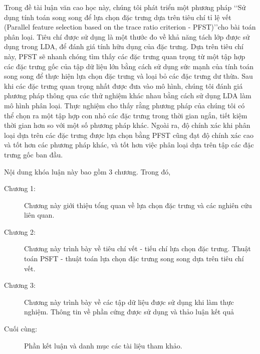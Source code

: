 Trong đề tài luận văn cao học này, chúng tôi phát triển một phương pháp \lq\lq Sử dụng tính toán song song để lựa chọn đặc trưng dựa trên tiêu chí tỉ lệ vết (Parallel feature selection based on the trace ratio criterion - PFST)\rq\rq cho bài toán phân loại. Tiêu chí được sử dụng là một thước đo về khả năng tách lớp được sử dụng trong LDA, để đánh giá tính hữu dụng của đặc trưng. Dựa trên tiêu chí này, PFST sẽ nhanh chóng tìm thấy các đặc trưng quan trọng từ một tập hợp các đặc trưng gốc của tập dữ liệu lớn bằng cách sử dụng sức mạnh của tính toán song song để thực hiện lựa chọn đặc trưng và loại bỏ các đặc trưng dư thừa. Sau khi các đặc trưng quan trọng nhất được đưa vào mô hình, chúng tôi đánh giá phương pháp thông qua các thử nghiệm khác nhau bằng cách sử dụng LDA làm mô hình phân loại. Thực nghiệm cho thấy rằng phương pháp của chúng tôi có thể chọn ra một tập hợp con nhỏ các đặc trưng trong thời gian ngắn, tiết kiệm thời gian hơn so với một số phương pháp khác. Ngoài ra, độ chính xác khi phân loại dựa trên các đặc trưng được lựa chọn bằng PFST cũng đạt độ chính xác cao và tốt hơn các phương pháp khác, và tốt hơn việc phân loại dựa trên tập các đặc trưng gốc ban đầu.

Nội dung khóa luận này bao gồm 3 chương. Trong đó,
\begin{description}
	\item[Chương 1:] Chương này giới thiệu tổng quan về lựa chọn đặc trưng và các nghiên cứu liên quan.
	\item[Chương 2:] Chương này trình bày về tiêu chí vết - tiếu chí lựa chọn đặc trưng. Thuật toán PSFT - thuật toán lựa chọn đặc trưng song song dựa trên tiêu chí vết.
	\item[Chương 3:] Chương này trình bày về các tập dữ liệu được sử dụng khi làm thực nghiệm. Thông tin về phần cứng được sử dụng và thảo luận kết quả
	\item[Cuối cùng:] Phần kết luận và danh mục các tài liệu tham khảo.
\end{description}
